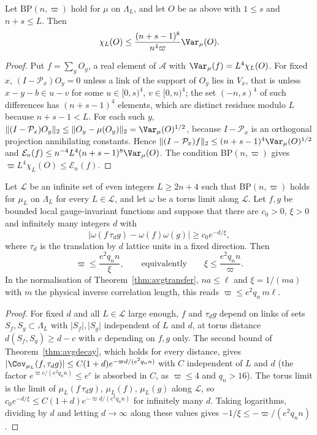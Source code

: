 \begin{proposition}[susceptibilities]\label{rD:suscept}
Let $\mathrm{BP}(n,\varpi)$ hold for $\mu$ on $\Lambda_L$, and let $O$ be as
above with $1\le s$ and $n+s\le L$. Then
\[
\chi_L(O)\le\frac{(n+s-1)^8}{n^4\varpi}\Var_\mu(O).
\]
\end{proposition}

\begin{proof}
Put $f=\sum_yO_y$, a real element of $\mathcal A$ with $\Var_\mu(f)=L^4
\chi_L(O)$. For fixed $x$, $(I-\mathcal P_x)O_y=0$ unless a link of the
support of $O_y$ lies in $V_x$, that is unless $x-y-b\in u-v$ for some
$u\in[0,s)^4$, $v\in[0,n)^4$; the set $(-n,s)^4$ of such differences has
$(n+s-1)^4$ elements, which are distinct residues modulo $L$ because
$n+s-1<L$. For each such $y$, $\lVert(I-\mathcal P_x)O_y\rVert_2\le\lVert
O_y-\mu(O_y)\rVert_2=\Var_\mu(O)^{1/2}$, because $I-\mathcal P_x$ is an
orthogonal projection annihilating constants. Hence $\lVert(I-\mathcal P_x)
f\rVert_2\le(n+s-1)^4\Var_\mu(O)^{1/2}$ and $\mathcal E_n(f)\le n^{-4}L^4
(n+s-1)^8\Var_\mu(O)$. The condition $\mathrm{BP}(n,\varpi)$ gives
$\varpi L^4\chi_L(O)\le\mathcal E_n(f)$.
\end{proof}

\begin{corollary}\label{rD:xi}
Let $\mathcal L$ be an infinite set of even integers $L\ge2n+4$ such that
$\mathrm{BP}(n,\varpi)$ holds for $\mu_L$ on $\Lambda_L$ for every $L\in
\mathcal L$, and let $\omega$ be a torus limit along $\mathcal L$. Let $f,g$
be bounded local gauge-invariant functions and suppose that there are
$c_0>0$, $\xi>0$ and infinitely many integers $d$ with
\[
\bigl\lvert\omega(f\,\tau_dg)-\omega(f)\omega(g)\bigr\rvert\ge c_0e^{-d/\xi},
\]
where $\tau_d$ is the translation by $d$ lattice units in a fixed
direction. Then
\[
\varpi\le\frac{e^2q_nn}\xi,\qquad\text{equivalently}\qquad\xi\le\frac{e^2q_n
n}\varpi .
\]
In the normalisation of Theorem~\ref{thm:avgtransfer}, $na\le\ell$ and
$\xi=1/(ma)$ with $m$ the physical inverse correlation length, this reads
$\varpi\le e^2q_n\,m\ell$.
\end{corollary}

\begin{proof}
For fixed $d$ and all $L\in\mathcal L$ large enough, $f$ and $\tau_dg$
depend on links of sets $S_f,S_g\subset\Lambda_L$ with $\lvert S_f\rvert,
\lvert S_g\rvert$ independent of $L$ and $d$, at torus distance
$d(S_f,S_g)\ge d-c$ with $c$ depending on $f,g$ only. The second bound of
Theorem~\ref{thm:avgdecay}, which holds for every distance, gives
$\lvert\Cov_{\mu_L}(f,\tau_dg)\rvert\le C(1+d)e^{-\varpi d/(e^2q_nn)}$ with
$C$ independent of $L$ and $d$ (the factor $e^{\varpi c/(e^2q_nn)}\le e^{c}$
is absorbed in $C$, as $\varpi\le4$ and $q_n>16$). The
torus limit is the limit of $\mu_L(f\,\tau_dg)$, $\mu_L(f)$, $\mu_L(g)$
along $\mathcal L$, so $c_0e^{-d/\xi}\le C(1+d)e^{-\varpi d/(e^2q_nn)}$ for
infinitely many $d$. Taking logarithms, dividing by $d$ and letting $d\to
\infty$ along these values gives $-1/\xi\le-\varpi/(e^2q_nn)$.
\end{proof}

